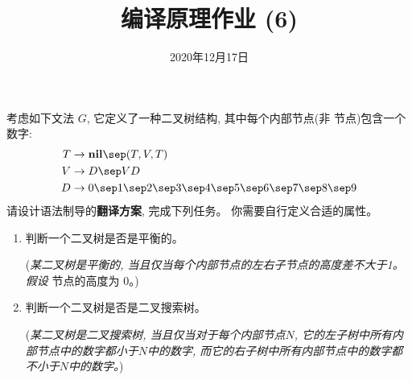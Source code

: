 \documentclass[a4paper, justified]{tufte-handout}
\title{编译原理作业 (6)}
\date{2020年12月17日}
\begin{document}
\maketitle
\noplagiarism %
\begin{abstract}
\end{abstract}
\beginrequired

\begin{problem}[\score{20 = 10 + 10}]
  考虑如下文法 $G$, 它定义了一种二叉树结构, 其中每个内部节点(非  节点)包含一个数字:
  \begin{align*}
    T &\to \text{\bf nil} \sep (T, V, T) \\
    V &\to D \sep V D \\
    D &\to 0 \sep 1 \sep 2 \sep 3 \sep 4 \sep 5 \sep 6 \sep 7 \sep 8 \sep 9
  \end{align*}
  请设计语法制导的{\bf 翻译方案}, 完成下列任务。
  你需要自行定义合适的属性。
  \begin{enumerate}[(1)]
    \item 判断一个二叉树是否是平衡的。

    ({\it 某二叉树是平衡的, 当且仅当每个内部节点的左右子节点的高度差不大于1。
        假设 } 节点的高度为 0。)
    \item 判断一个二叉树是否是二叉搜索树。

    ({\it 某二叉树是二叉搜索树, 当且仅当对于每个内部节点$N$,
        它的左子树中所有内部节点中的数字都小于$N$中的数字,
        而它的右子树中所有内部节点中的数字都不小于$N$中的数字。})
  \end{enumerate}
\end{problem}

\begin{solution}
\end{solution}
\end{document}
